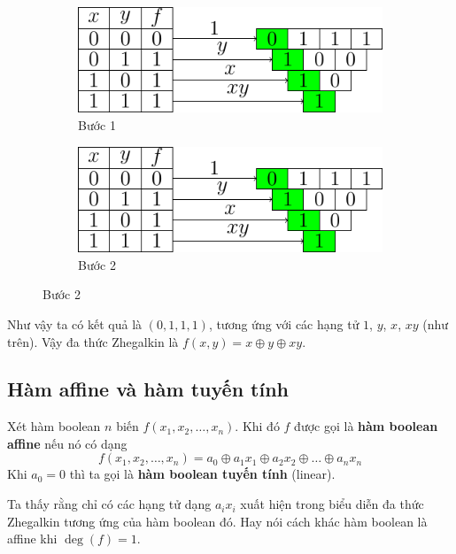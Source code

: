 \begin{figure}[ht]
    \begin{subfigure}{0.45\textwidth}
        \centering
        \includegraphics[page=3]{figures/boolean/zhegalkin.pdf}
        \caption{Bước 1}
    \end{subfigure}
    \hfill
    \begin{subfigure}{0.45\textwidth}
        \centering
        \includegraphics[page=4]{figures/boolean/zhegalkin.pdf}
        \caption{Bước 2}
    \end{subfigure}
\end{figure}

Như vậy ta có kết quả là $(0, 1, 1, 1)$, tương ứng với các
hạng tử $1$, $y$, $x$, $xy$ (như trên). Vậy đa thức Zhegalkin
là $f(x, y) = x \oplus y \oplus xy$.

\subsection*{Hàm affine và hàm tuyến tính}

\begin{definition}
    Xét hàm boolean $n$ biến $f(x_1, x_2, \ldots, x_n)$.
    Khi đó $f$ được gọi là \textbf{hàm boolean affine} nếu nó có dạng
    \begin{equation}
        f(x_1, x_2, \ldots, x_n) = a_0 \oplus a_1 x_1 \oplus 
        a_2 x_2 \oplus \ldots \oplus a_n x_n
    \end{equation}
    Khi $a_0 = 0$ thì ta gọi là \textbf{hàm boolean tuyến tính}
    (linear).
\end{definition}

Ta thấy rằng chỉ có các hạng tử dạng $a_i x_i$ xuất hiện trong
biểu diễn đa thức Zhegalkin tương ứng của hàm boolean đó. Hay 
nói cách khác hàm boolean là affine khi $\deg(f) = 1$.

